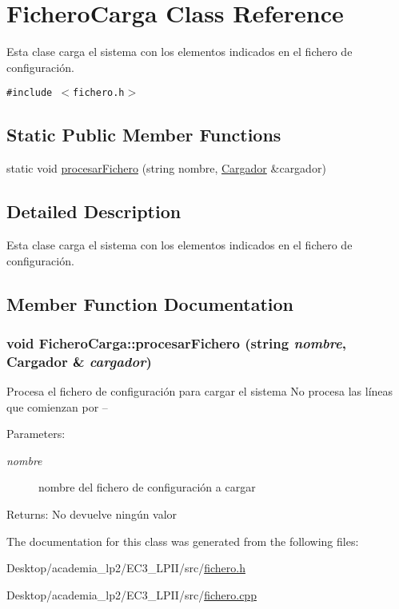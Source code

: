\hypertarget{classFicheroCarga}{
\section{FicheroCarga Class Reference}
\label{classFicheroCarga}
}
Esta clase carga el sistema con los elementos indicados en el fichero de configuración.  


{\tt \#include $<$fichero.h$>$}

\subsection*{Static Public Member Functions}
\begin{CompactItemize}
\item 
static void \hyperlink{classFicheroCarga_d7a3e4e6e3eeb749fe151ce6763cc9c4}{procesarFichero} (string nombre, \hyperlink{classCargador}{Cargador} \&cargador)
\end{CompactItemize}


\subsection{Detailed Description}
Esta clase carga el sistema con los elementos indicados en el fichero de configuración. 

\subsection{Member Function Documentation}
\hypertarget{classFicheroCarga_d7a3e4e6e3eeb749fe151ce6763cc9c4}{
\subsubsection[procesarFichero]{\setlength{\rightskip}{0pt plus 5cm}void FicheroCarga::procesarFichero (string {\em nombre}, \/  {\bf Cargador} \& {\em cargador})}}
\label{classFicheroCarga_d7a3e4e6e3eeb749fe151ce6763cc9c4}


Procesa el fichero de configuración para cargar el sistema No procesa las líneas que comienzan por -- \begin{Desc}
\item[Parameters:]
\begin{description}
\item[{\em nombre}]nombre del fichero de configuración a cargar \end{description}
\end{Desc}
\begin{Desc}
\item[Returns:]No devuelve ningún valor \end{Desc}


The documentation for this class was generated from the following files:\begin{CompactItemize}
\item 
Desktop/academia\_\-lp2/EC3\_\-LPII/src/\hyperlink{fichero_8h}{fichero.h}\item 
Desktop/academia\_\-lp2/EC3\_\-LPII/src/\hyperlink{fichero_8cpp}{fichero.cpp}\end{CompactItemize}
